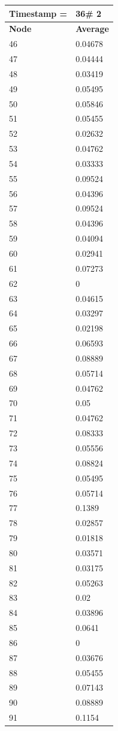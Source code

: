 \begin{tabular}{|l||l|}
\hline
\textbf{Timestamp =} & \textbf{36}\# 2\\\hline
	\textbf{Node} & \textbf{Average} \\ \hline
\hline
	46 & 0.04678 \\ \hline
	47 & 0.04444 \\ \hline
	48 & 0.03419 \\ \hline
	49 & 0.05495 \\ \hline
	50 & 0.05846 \\ \hline
	51 & 0.05455 \\ \hline
	52 & 0.02632 \\ \hline
	53 & 0.04762 \\ \hline
	54 & 0.03333 \\ \hline
	55 & 0.09524 \\ \hline
	56 & 0.04396 \\ \hline
	57 & 0.09524 \\ \hline
	58 & 0.04396 \\ \hline
	59 & 0.04094 \\ \hline
	60 & 0.02941 \\ \hline
	61 & 0.07273 \\ \hline
	62 & 0 \\ \hline
	63 & 0.04615 \\ \hline
	64 & 0.03297 \\ \hline
	65 & 0.02198 \\ \hline
	66 & 0.06593 \\ \hline
	67 & 0.08889 \\ \hline
	68 & 0.05714 \\ \hline
	69 & 0.04762 \\ \hline
	70 & 0.05 \\ \hline
	71 & 0.04762 \\ \hline
	72 & 0.08333 \\ \hline
	73 & 0.05556 \\ \hline
	74 & 0.08824 \\ \hline
	75 & 0.05495 \\ \hline
	76 & 0.05714 \\ \hline
	77 & 0.1389 \\ \hline
	78 & 0.02857 \\ \hline
	79 & 0.01818 \\ \hline
	80 & 0.03571 \\ \hline
	81 & 0.03175 \\ \hline
	82 & 0.05263 \\ \hline
	83 & 0.02 \\ \hline
	84 & 0.03896 \\ \hline
	85 & 0.0641 \\ \hline
	86 & 0 \\ \hline
	87 & 0.03676 \\ \hline
	88 & 0.05455 \\ \hline
	89 & 0.07143 \\ \hline
	90 & 0.08889 \\ \hline
	91 & 0.1154 \\ \hline
\end{tabular}
